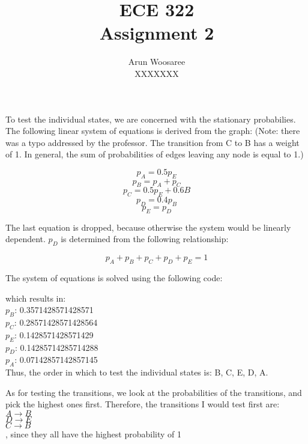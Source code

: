 \documentclass[letterpaper]{article}
\title{ECE 322 \\
Assignment 2}
\author{Arun Woosaree\\
  XXXXXXX}
\begin{document}
\maketitle %

\section{}
To test the individual states, we are concerned with the stationary
probabilies. The following linear system of equations is derived from the
graph: (Note: there was a typo addressed by the professor. The transition from
C to B has a weight of 1. In general, the sum of probabilities of edges leaving
any node is equal to 1.)

  \[ p_A = 0.5p_E \]
  \[ p_B = p_A + p_C \]
  \[ p_C = 0.5p_E + 0.6B \]
  \[ p_D = 0.4p_B \]
  \[ p_E = p_D \]

The last equation is dropped, because otherwise the system would be linearly
dependent. $p_D$ is determined from the following relationship:

  \[ p_A+p_B+p_C+p_D+p_E = 1 \]

The system of equations is solved using the following code:

\vspace{1cm}
\begin{adjustbox}{width=\textwidth}

\end{adjustbox}
\vspace{2cm}

which results in:
\\
$p_B$: 0.3571428571428571\\
$p_C$: 0.28571428571428564\\
$p_E$: 0.1428571428571429\\
$p_D$: 0.14285714285714288\\
$p_A$: 0.07142857142857145\\

Thus, the order in which to test the individual states is: B, C, E, D, A.
\vspace{1cm}

As for testing the transitions, we look at the probabilities of the
transitions, and pick the highest ones first. Therefore, the transitions I
would test first are:
\\
$A\to B$\\
$D\to E$\\
$C\to B$\\

, since they all have the highest probability of 1
\end{document}
